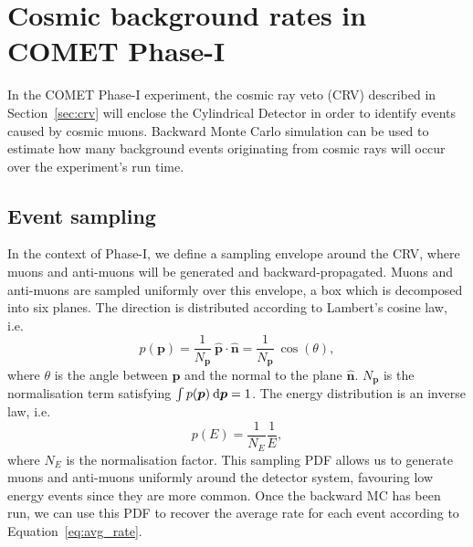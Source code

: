 \section{Cosmic background rates in COMET Phase-I}
In the COMET Phase-I experiment, the cosmic ray veto (CRV) described in
Section~\ref{sec:crv} will enclose the Cylindrical Detector in order to identify
events caused by cosmic muons. Backward Monte Carlo simulation can be used to
estimate how many background events originating from cosmic rays will occur over
the experiment's run time. 

\subsection{Event sampling}
In the context of Phase-I, we define a sampling envelope around the CRV, where
muons and anti-muons will be generated and backward-propagated. Muons and
anti-muons are sampled uniformly over this envelope, a box which is decomposed
into six planes. The direction is distributed according to Lambert's cosine law,
i.e.\ 
$$
p(\bm{p}) = 
    \frac{1}{N_{\bm{p}}} \ \hat{\bm{p}} \cdot \hat{\bm{n}} = 
    \frac{1}{N_{\bm{p}}}\:\cos(\theta),
$$
where $\theta$ is the angle between $\bm{p}$ and the normal to the plane
$\hat{\bm{n}}$. $N_{\bm{p}}$ is the normalisation term satisfying 
$\int p(\bm{p}) \: \textnormal{d}\bm{p} = 1$.
The energy distribution is an inverse law, i.e.\ 
$$
p(E) = \frac{1}{N_E}  \frac{1}{E},
$$
where $N_E$ is the normalisation factor. 
This sampling PDF allows us to generate muons and anti-muons uniformly around the
detector system, favouring low energy events since they are more common. Once
the backward MC has been run, we can use this PDF to recover the average rate
for each event according to Equation~\ref{eq:avg_rate}.

